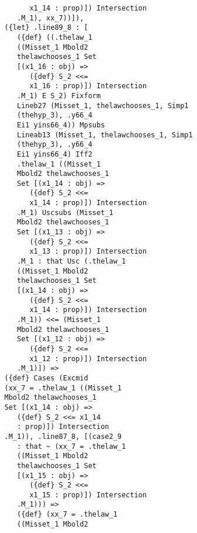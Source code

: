 \documentclass{article}
\begin{document}
\begin{verbatim}
                            x1_14 : prop)]) Intersection 
                         .M_1), xx_7))]), 
                      ({let} .line89_8 : [
                         ({def} ((.thelaw_1 
                         ((Misset_1 Mbold2 
                         thelawchooses_1 Set 
                         [(x1_16 : obj) => 
                            ({def} S_2 <<= 
                            x1_16 : prop)]) Intersection 
                         .M_1) E S_2) Fixform 
                         Lineb27 (Misset_1, thelawchooses_1, Simp1 
                         (thehyp_3), .y66_4 
                         Ei1 yins66_4)) Mpsubs 
                         Lineab13 (Misset_1, thelawchooses_1, Simp1 
                         (thehyp_3), .y66_4 
                         Ei1 yins66_4) Iff2 
                         .thelaw_1 ((Misset_1 
                         Mbold2 thelawchooses_1 
                         Set [(x1_14 : obj) => 
                            ({def} S_2 <<= 
                            x1_14 : prop)]) Intersection 
                         .M_1) Uscsubs (Misset_1 
                         Mbold2 thelawchooses_1 
                         Set [(x1_13 : obj) => 
                            ({def} S_2 <<= 
                            x1_13 : prop)]) Intersection 
                         .M_1 : that Usc (.thelaw_1 
                         ((Misset_1 Mbold2 
                         thelawchooses_1 Set 
                         [(x1_14 : obj) => 
                            ({def} S_2 <<= 
                            x1_14 : prop)]) Intersection 
                         .M_1)) <<= (Misset_1 
                         Mbold2 thelawchooses_1 
                         Set [(x1_12 : obj) => 
                            ({def} S_2 <<= 
                            x1_12 : prop)]) Intersection 
                         .M_1)]) => 
                      ({def} Cases (Excmid 
                      (xx_7 = .thelaw_1 ((Misset_1 
                      Mbold2 thelawchooses_1 
                      Set [(x1_14 : obj) => 
                         ({def} S_2 <<= x1_14 
                         : prop)]) Intersection 
                      .M_1)), .line87_8, [(case2_9 
                         : that ~ (xx_7 = .thelaw_1 
                         ((Misset_1 Mbold2 
                         thelawchooses_1 Set 
                         [(x1_15 : obj) => 
                            ({def} S_2 <<= 
                            x1_15 : prop)]) Intersection 
                         .M_1))) => 
                         ({def} (xx_7 = .thelaw_1 
                         ((Misset_1 Mbold2 

\end{verbatim}
\end{document}
